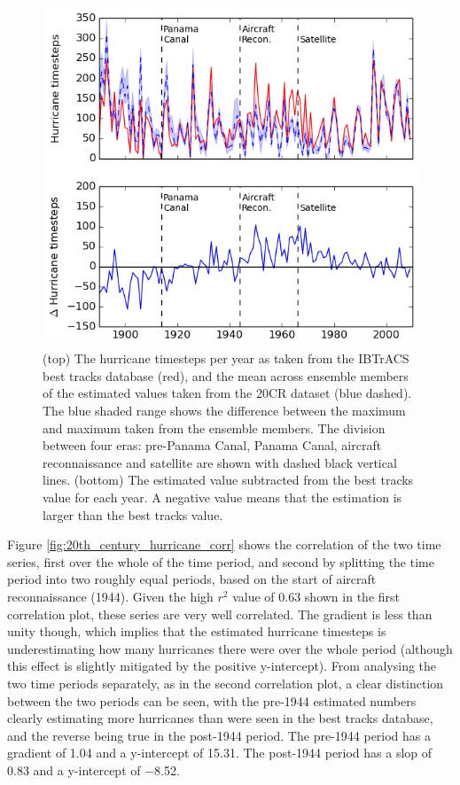 \documentclass[pdftex,12pt,a4paper]{report}
\begin{document}
\begin{figure}[ht!]
    \centering
    \includegraphics[width=\textwidth]{figures/20th_century_hurricane_timesteps}
    \caption{(top) The hurricane timesteps per year as taken from the IBTrACS best tracks database
        (red), and the mean across ensemble members of the estimated values taken from the 20CR
        dataset (blue dashed). The blue shaded range shows the difference between the maximum and maximum
        taken from the ensemble members. The division between four eras: pre-Panama Canal, Panama
        Canal, aircraft reconnaissance and satellite are shown with dashed black vertical lines.
        (bottom) The estimated value subtracted from the best tracks value for each year. A negative
        value means that the estimation is larger than the best tracks value.}
    \label{fig:20th_century_hurricane_timesteps}
\end{figure}

\newpage
Figure \ref{fig:20th_century_hurricane_corr} shows the correlation of the two time series, first
over the whole of the time period, and second by splitting the time period into two roughly equal
periods, based on the start of aircraft reconnaissance (1944). Given the high $r^2$ value of
\SI{0.63}{} shown in the first correlation plot, these series are very well correlated. The gradient
is less than unity though, which implies that the estimated hurricane timesteps is underestimating
how many hurricanes there were over the whole period (although this effect is slightly mitigated by
the positive y-intercept).  From analysing the two time periods separately, as in the second
correlation plot, a clear distinction between the two periods can be seen, with the pre-1944
estimated numbers clearly estimating more hurricanes than were seen in the best tracks database, and
the reverse being true in the post-1944 period. The pre-1944 period has a gradient of \SI{1.04}{}
and a y-intercept of \SI{15.31}{}. The post-1944 period has a slop of \SI{0.83}{} and a y-intercept
of \SI{-8.52}{}.
\end{document}
